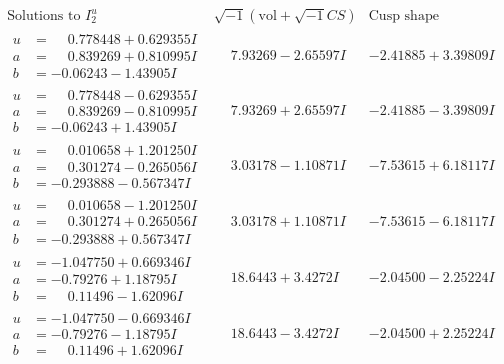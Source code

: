 \documentclass[1p]{elsarticle_modified}
\theoremstyle{definition}
\newcommand{\I}{\sqrt{-1}}
\begin{document}
$$\begin{array}{c|c|c}  
\text{Solutions to }I^u_{2}& \I (\text{vol} + \sqrt{-1}CS) & \text{Cusp shape}\\
 \hline 
\begin{aligned}
u &= \phantom{-}0.778448 + 0.629355 I \\
a &= \phantom{-}0.839269 + 0.810995 I \\
b &= -0.06243 - 1.43905 I\end{aligned}
 & \phantom{-}7.93269 - 2.65597 I & -2.41885 + 3.39809 I \\ \hline\begin{aligned}
u &= \phantom{-}0.778448 - 0.629355 I \\
a &= \phantom{-}0.839269 - 0.810995 I \\
b &= -0.06243 + 1.43905 I\end{aligned}
 & \phantom{-}7.93269 + 2.65597 I & -2.41885 - 3.39809 I \\ \hline\begin{aligned}
u &= \phantom{-}0.010658 + 1.201250 I \\
a &= \phantom{-}0.301274 - 0.265056 I \\
b &= -0.293888 - 0.567347 I\end{aligned}
 & \phantom{-}3.03178 - 1.10871 I & -7.53615 + 6.18117 I \\ \hline\begin{aligned}
u &= \phantom{-}0.010658 - 1.201250 I \\
a &= \phantom{-}0.301274 + 0.265056 I \\
b &= -0.293888 + 0.567347 I\end{aligned}
 & \phantom{-}3.03178 + 1.10871 I & -7.53615 - 6.18117 I \\ \hline\begin{aligned}
u &= -1.047750 + 0.669346 I \\
a &= -0.79276 + 1.18795 I \\
b &= \phantom{-}0.11496 - 1.62096 I\end{aligned}
 & \phantom{-}18.6443 + 3.4272 I & -2.04500 - 2.25224 I \\ \hline\begin{aligned}
u &= -1.047750 - 0.669346 I \\
a &= -0.79276 - 1.18795 I \\
b &= \phantom{-}0.11496 + 1.62096 I\end{aligned}
 & \phantom{-}18.6443 - 3.4272 I & -2.04500 + 2.25224 I \\ \hline\begin{aligned}

\end{aligned}
\end{array}$$
\end{document}
